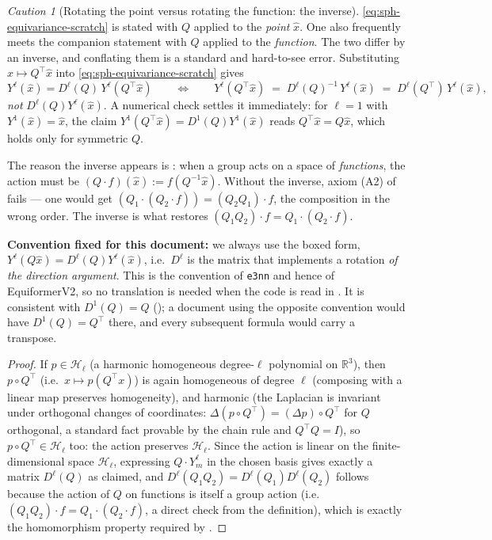 \documentclass[11pt,a4paper]{report}
\theoremstyle{definition}
\theoremstyle{remark}
\newtheorem{caution}[caution]{Caution}
\newcommand{\RR}{\mathbb R}
\begin{document}
\begin{caution}[Rotating the point versus rotating the function: the inverse]
\label{caution:function-action-inverse}
\eqref{eq:sph-equivariance-scratch} is stated with $Q$ applied to the
\emph{point} $\hat x$. One also frequently meets the companion statement
with $Q$ applied to the \emph{function}. The two differ by an inverse, and
conflating them is a standard and hard-to-see error. Substituting
$\hat x\mapsto Q^\top\hat x$ into \eqref{eq:sph-equivariance-scratch} gives
\[
Y^\ell(\hat x) = D^\ell(Q)\,Y^\ell(Q^\top\hat x)
\qquad\Longleftrightarrow\qquad
Y^\ell(Q^\top\hat x) \;=\; D^\ell(Q)^{-1}\,Y^\ell(\hat x)
\;=\; D^\ell(Q^\top)\,Y^\ell(\hat x) ,
\]
\emph{not} $D^\ell(Q)Y^\ell(\hat x)$. A numerical check settles it
immediately: for $\ell=1$ with $Y^1(\hat x)=\hat x$, the claim
$Y^1(Q^\top\hat x)=D^1(Q)Y^1(\hat x)$ reads $Q^\top\hat x = Q\hat x$, which
holds only for symmetric $Q$.

The reason the inverse appears is : when a
group acts on a space of \emph{functions}, the action must be
$(Q\cdot f)(\hat x) := f(Q^{-1}\hat x)$. Without the inverse, axiom (A2) of
 fails --- one would get
$(Q_1\cdot(Q_2\cdot f))=(Q_2Q_1)\cdot f$, the composition in the wrong order.
The inverse is what restores $(Q_1Q_2)\cdot f = Q_1\cdot(Q_2\cdot f)$.

\textbf{Convention fixed for this document:} we always use the boxed form,
$Y^\ell(Q\hat x)=D^\ell(Q)Y^\ell(\hat x)$, i.e.\ $D^\ell$ is the matrix that
implements a rotation \emph{of the direction argument}. This is the
convention of \texttt{e3nn} and hence of EquiformerV2, so no translation is
needed when the code is read in . It is consistent
with $D^1(Q)=Q$ (); a document using the opposite convention
would have $D^1(Q)=Q^\top$ there, and every subsequent formula would carry a
transpose.
\end{caution}

\begin{proof}
If $p\in\mathcal H_\ell$ (a harmonic homogeneous degree-$\ell$ polynomial on
$\RR^3$), then $p\circ Q^\top$ (i.e.\ $x\mapsto p(Q^\top x)$) is again
homogeneous of degree $\ell$ (composing with a linear map preserves
homogeneity), and harmonic (the Laplacian is invariant under orthogonal
changes of coordinates: $\Delta(p\circ Q^\top)=(\Delta p)\circ Q^\top$ for
$Q$ orthogonal, a standard fact provable by the chain rule and
$Q^\top Q=I$), so $p\circ Q^\top\in\mathcal H_\ell$ too: the action preserves
$\mathcal H_\ell$. Since the action is linear on the finite-dimensional
space $\mathcal H_\ell$, expressing $Q\cdot Y^\ell_m$ in the chosen basis
gives exactly a matrix $D^\ell(Q)$ as claimed, and
$D^\ell(Q_1Q_2)=D^\ell(Q_1)D^\ell(Q_2)$ follows because the action of $Q$ on
functions is itself a group action (i.e.\ $(Q_1Q_2)\cdot f = Q_1\cdot(Q_2\cdot f)$,
a direct check from the definition), which is exactly the homomorphism
property required by .
\end{proof}
\end{document}
